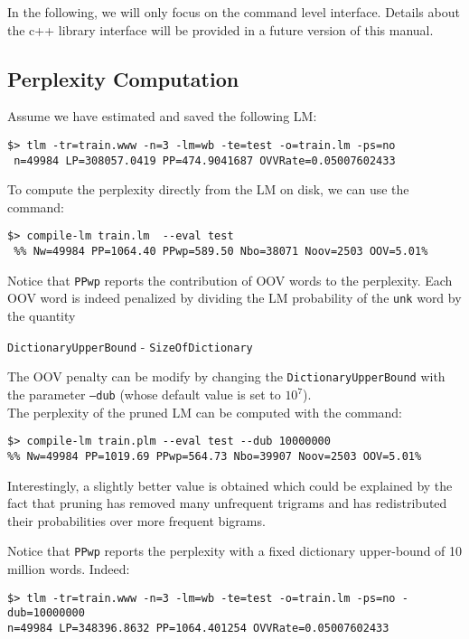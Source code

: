 \documentclass[11pt]{article}
\begin{document}
\noindent
In the following, we will only focus on the command level interface. Details about
the c++ library interface will be provided in a future version of this manual.  

\subsection{Perplexity Computation}
Assume we have estimated and saved the following LM:

\begin{verbatim}
$> tlm -tr=train.www -n=3 -lm=wb -te=test -o=train.lm -ps=no
 n=49984 LP=308057.0419 PP=474.9041687 OVVRate=0.05007602433
\end{verbatim}

\noindent
To compute the perplexity directly from the LM on disk, we can use the command:

\begin{verbatim}
$> compile-lm train.lm  --eval test
 %% Nw=49984 PP=1064.40 PPwp=589.50 Nbo=38071 Noov=2503 OOV=5.01%
\end{verbatim}
Notice that {\tt PPwp} reports the contribution of OOV words to the perplexity. Each OOV word is indeed penalized by dividing the
LM probability of the {\tt unk} word by  the quantity


\centerline{{\tt DictionaryUpperBound} - {\tt SizeOfDictionary}}

\noindent
The OOV penalty can be modify by changing the {\tt DictionaryUpperBound} with the parameter {\tt --dub} (whose default value is set to $10^7$). \\

\noindent
The perplexity of the pruned LM can be computed with the command:
\begin{verbatim}
$> compile-lm train.plm --eval test --dub 10000000
%% Nw=49984 PP=1019.69 PPwp=564.73 Nbo=39907 Noov=2503 OOV=5.01%
\end{verbatim}
Interestingly, a slightly better value is obtained which could be explained by the 
fact that pruning has removed many unfrequent trigrams and has redistributed 
their probabilities over more frequent bigrams.

\noindent
Notice that {\tt PPwp} reports the perplexity with a fixed dictionary upper-bound of 10 million words. Indeed:
\begin{verbatim}
$> tlm -tr=train.www -n=3 -lm=wb -te=test -o=train.lm -ps=no -dub=10000000 
n=49984 LP=348396.8632 PP=1064.401254 OVVRate=0.05007602433
\end{verbatim}
\end{document}

